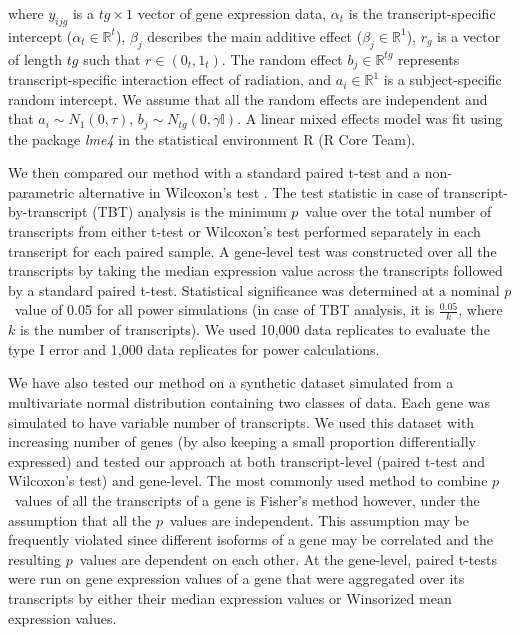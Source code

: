 \documentclass[hidelinks,11pt]{article}
\begin{document}
where $y_{ijg}$ is a $tg \times 1$ vector of gene expression data, $\alpha_t$ is the transcript-specific intercept ($\alpha_t \in \mathbb{R}^t$), $\beta_j$ describes the main additive effect ($\beta_j \in \mathbb{R}^1$), $r_g$ is a vector of length $tg$ such that $r \in \left(0_{t},1_{t}\right)$. The random effect $b_j \in \mathbb{R}^{tg}$ represents transcript-specific interaction effect of radiation, and $a_i \in \mathbb{R}^1$ is a subject-specific random intercept. We assume that all the random effects are independent and that $a_i \sim N_1 \left(0, \tau \right)$, $b_j \sim N_{tg} \left(0, \gamma\mathbb{I} \right)$. A linear mixed effects model was fit using the package \emph{lme4}\cite{lme4} in the statistical environment R (R Core Team). 

We then compared our method with a standard paired t-test and a non-parametric alternative in Wilcoxon's test \cite{wilcoxon}. The test statistic in case of transcript-by-transcript (TBT) analysis is the minimum $p$~value over the total number of transcripts from either t-test or Wilcoxon's test performed separately in each transcript for each paired sample. A gene-level test was constructed over all the transcripts by taking the median expression value across the transcripts followed by a standard paired t-test. Statistical significance was determined at a nominal $p$~value of 0.05 for all power simulations (in case of TBT analysis, it is $\frac{0.05}{k}$,  where $k$ is the number of transcripts). We used 10,000 data replicates to evaluate the type I error and 1,000 data replicates for power calculations. 

We have also tested our method on a synthetic dataset simulated from a multivariate normal distribution containing two classes of data. Each gene was simulated to have variable number of transcripts. We used this dataset with increasing number of genes (by also keeping a small proportion differentially expressed) and tested our approach at both transcript-level (paired t-test and Wilcoxon's test) and gene-level. The most commonly used method to combine $p$~values of all the transcripts of a gene is Fisher's method however, under the assumption that all the $p$~values are independent. This assumption may be frequently violated since different isoforms of a gene may be correlated and the resulting $p$~values are dependent on each other. At the gene-level, paired t-tests were run on gene expression values of a gene that were aggregated over its transcripts by either their median expression values or Winsorized mean \cite{winsor} expression values.
\end{document}
